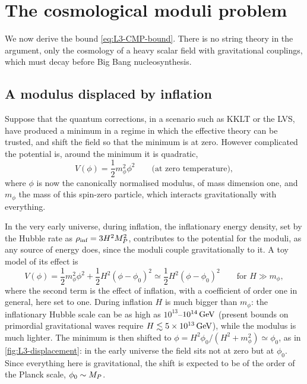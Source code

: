 \section{The cosmological moduli problem}
\label{sec:L3-CMP}

We now derive the bound \cref{eq:L3-CMP-bound}. There is no string theory in the argument, only the cosmology of a heavy scalar field with gravitational couplings, which must decay before Big Bang nucleosynthesis.

\subsection{A modulus displaced by inflation}

Suppose that the quantum corrections, in a scenario such as KKLT or the LVS, have produced a minimum in a regime in which the effective theory can be trusted, and shift the field so that the minimum is at zero. However complicated the potential is, around the minimum it is quadratic,
\begin{equation}
  V(\phi) = \frac12m_\phi^2\phi^2 \qquad\text{(at zero temperature)} ,
  \label{eq:L3-V0}
\end{equation}
where $\phi$ is now the canonically normalised modulus, of mass dimension one, and $m_\phi$ the mass of this spin-zero particle, which interacts gravitationally with everything.

In the very early universe, during inflation, the inflationary energy density, set by the Hubble rate as $\rho_{\text{inf}} = 3H^2M_{P}^2$, contributes to the potential for the moduli, as any source of energy does, since the moduli couple gravitationally to it. A toy model of its effect is
\begin{equation}
  V(\phi) = \frac12m_\phi^2\phi^2 + \frac12H^2(\phi-\phi_0)^2
  \simeq \frac12H^2(\phi-\phi_0)^2 \qquad\text{for } H\gg m_\phi ,
  \label{eq:L3-Vinf}
\end{equation}
where the second term is the effect of inflation, with a coefficient of order one in general, here set to one. During inflation $H$ is much bigger than $m_\phi$: the inflationary Hubble scale can be as high as $10^{13}$--$10^{14}\,\mathrm{GeV}$ (present bounds on primordial gravitational waves require $H\lesssim5\times10^{13}\,\mathrm{GeV}$), while the modulus is much lighter. The minimum is then shifted to $\phi = H^2\phi_0/(H^2+m_\phi^2)\simeq\phi_0$, as in \cref{fig:L3-displacement}: in the early universe the field sits not at zero but at $\phi_0$. Since everything here is gravitational, the shift is expected to be of the order of the Planck scale, $\phi_0\sim M_{P}$.

